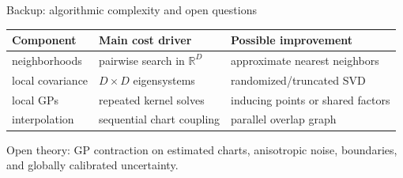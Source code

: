 \documentclass[aspectratio=169,10pt]{beamer}
\newcommand{\R}{\mathbb R}
\begin{document}
\begin{frame}{Backup: algorithmic complexity and open questions}
  \vspace{4pt}
  \begin{center}
    \begin{tabular}{lll}
      \toprule
      Component & Main cost driver & Possible improvement\\
      \midrule
      neighborhoods & pairwise search in \(\R^D\) & approximate nearest neighbors\\
      local covariance & \(D\times D\) eigensystems & randomized/truncated SVD\\
      local GPs & repeated kernel solves & inducing points or shared factors\\
      interpolation & sequential chart coupling & parallel overlap graph\\
      \bottomrule
    \end{tabular}
  \end{center}
  \vspace{0.25cm}
  Open theory: GP contraction on estimated charts, anisotropic noise,
  boundaries, and globally calibrated uncertainty.
\end{frame}
\end{document}
